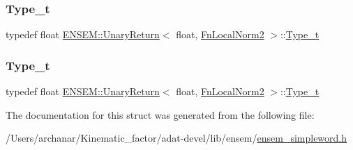 \mbox{\label{structENSEM_1_1UnaryReturn_3_01float_00_01FnLocalNorm2_01_4_ae3f20d3aa61a3012baf0d735dd9441d8}} 
\subsubsection{\texorpdfstring{Type\_t}{Type\_t}\hspace{0.1cm}{\footnotesize\ttfamily [2/3]}}
{\footnotesize\ttfamily typedef float \mbox{\hyperlink{structENSEM_1_1UnaryReturn}{E\+N\+S\+E\+M\+::\+Unary\+Return}}$<$ float, \mbox{\hyperlink{structENSEM_1_1FnLocalNorm2}{Fn\+Local\+Norm2}} $>$\+::\mbox{\hyperlink{structENSEM_1_1UnaryReturn_3_01float_00_01FnLocalNorm2_01_4_ae3f20d3aa61a3012baf0d735dd9441d8}{Type\+\_\+t}}}

\mbox{\label{structENSEM_1_1UnaryReturn_3_01float_00_01FnLocalNorm2_01_4_ae3f20d3aa61a3012baf0d735dd9441d8}} 
\subsubsection{\texorpdfstring{Type\_t}{Type\_t}\hspace{0.1cm}{\footnotesize\ttfamily [3/3]}}
{\footnotesize\ttfamily typedef float \mbox{\hyperlink{structENSEM_1_1UnaryReturn}{E\+N\+S\+E\+M\+::\+Unary\+Return}}$<$ float, \mbox{\hyperlink{structENSEM_1_1FnLocalNorm2}{Fn\+Local\+Norm2}} $>$\+::\mbox{\hyperlink{structENSEM_1_1UnaryReturn_3_01float_00_01FnLocalNorm2_01_4_ae3f20d3aa61a3012baf0d735dd9441d8}{Type\+\_\+t}}}



The documentation for this struct was generated from the following file\+:\begin{DoxyCompactItemize}
\item 
/\+Users/archanar/\+Kinematic\+\_\+factor/adat-\/devel/lib/ensem/\mbox{\hyperlink{adat-devel_2lib_2ensem_2ensem__simpleword_8h}{ensem\+\_\+simpleword.\+h}}\end{DoxyCompactItemize}
